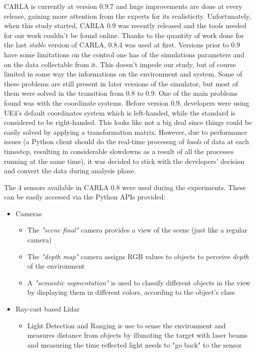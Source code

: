 CARLA is currently at version 0.9.7 and huge improvements are done at every release, gaining more attention from the experts for its realisticity. Unfortunately, when this study started, CARLA 0.9 was recently released and the tools needed for our work couldn't be found online. Thanks to the quantity of work done for the last \textit{stable} version of CARLA, 0.8.4 was used at first.\newline
Versions prior to 0.9 have some limitations on the control one has of the simulations parameters and on the data collectable from it. This doesn't impede our study, but of course limited in some way the informations on the environment and system. Some of these problems are still present in later versions of the simulator, but most of them were solved in the transition from 0.8 to 0.9.\newline\newline
One of the main problems found was with the coordinate systems. Before version 0.9, developers were using UE4's default coordinates system which is left-handed, while the standard is considered to be right-handed. This looks like not a big deal since things could be easily solved by applying a transformation matrix. However, due to performance issues (a Python client should do the real-time processng of \textsl{loads} of data at each timestep, resulting in considerable slowdowns as a result of all the processes running at the same time), it was decided to stick with the developers' decision and convert the data during analysis phase.

The 4 sensors available in CARLA 0.8 were used during the experiments. These can be easily accessed via the Python APIs provided:

\begin{itemize}
	\item Cameras
	\begin{itemize}
		\item The \textsl{"scene final"} camera provides a view of the scene (just like a regular camera)
		\item The \textsl{"depth map"} camera assigns RGB values to objects to perceive \textsl{depth} of the environment
		\item A \textsl{"semantic segmentation"} is used to classify different objects in the view by displaying them in different colors, according to the object's class
	\end{itemize}
	\item Ray-cast based Lidar
	\begin{itemize}
		\item Light Detection and Ranging is use to sense the environment and measures distance from objects by illunating the target with laser beams and measuring the time reflected light needs to "go back" to the sensor
	\end{itemize}
\end{itemize}

